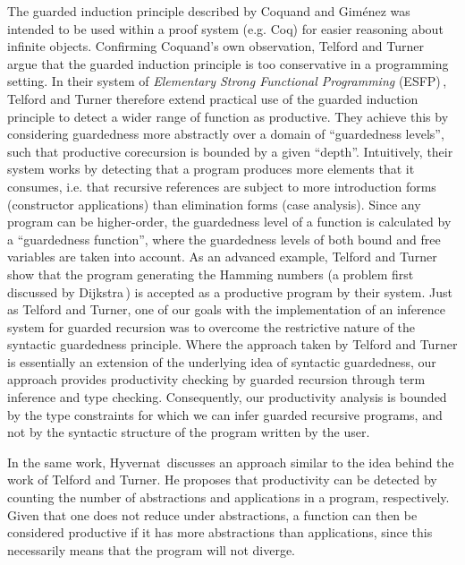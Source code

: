 The guarded induction principle described by Coquand and Gim\'{e}nez was
intended to be used within a proof system (e.g. Coq) for easier reasoning about
infinite objects. Confirming Coquand's own observation, Telford and
Turner\,\citep{Telford98ensuringthe} argue that the guarded induction principle
is too conservative in a programming setting. In their system of
\emph{Elementary Strong Functional Programming}
(ESFP)\,\citep{Telford97ensuringstreams,Telford98ensuringthe,Telford:jucs_6_4:ensuring_termination_in_esfp},
Telford and Turner therefore extend practical use of the guarded induction
principle to detect a wider range of function as productive. They achieve this
by considering guardedness more abstractly over a domain of ``guardedness
levels'', such that productive corecursion is bounded by a given
``depth''. Intuitively, their system works by detecting that a program produces
more elements that it consumes, i.e. that recursive references are subject to
more introduction forms (constructor applications) than elimination forms (case
analysis). Since any program can be higher-order, the guardedness level of a
function is calculated by a ``guardedness function'',  where the guardedness
levels of both bound and free variables are taken into account. As an advanced
example, Telford and Turner show that the program generating the Hamming numbers
(a problem first discussed by Dijkstra\,\citep{Dijkstra:1997}) is accepted as a
productive program by their system. Just as Telford and Turner, one of our goals
with the implementation of an inference system for guarded recursion was to
overcome the restrictive nature of the syntactic guardedness principle. Where
the approach taken by Telford and Turner is essentially an extension of the
underlying idea of syntactic guardedness, our approach provides productivity
checking by guarded recursion through term inference and type
checking. Consequently, our productivity analysis is bounded by the type
constraints for which we can infer guarded recursive programs, and not by the
syntactic structure of the program written by the user.

In the same work, Hyvernat\,\citep{Hyvernat13} discusses an approach similar to
the idea behind the work of Telford and Turner. He proposes that productivity
can be detected by counting the number of abstractions and applications in a
program, respectively. Given that one does not reduce under abstractions, a
function can then be considered productive if it has more abstractions than
applications, since this necessarily means that the program will not diverge.


